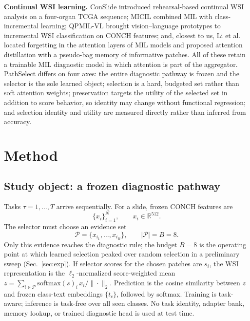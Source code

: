 \documentclass{article}
\newcommand{\Psel}{\mathcal{P}}
\begin{document}
\textbf{Continual WSI learning.} ConSlide \cite{huang2023conslide} introduced rehearsal-based continual WSI analysis on a four-organ TCGA sequence; MICIL \cite{meseguer2024micil} combined MIL with class-incremental learning; QPMIL-VL \cite{gou2025qpmil} brought vision--language prototypes to incremental WSI classification on CONCH features; and, closest to us, Li et al.\ \cite{li2025akd} located forgetting in the attention layers of MIL models and proposed attention distillation with a pseudo-bag memory of informative patches. All of these retain a trainable MIL diagnostic model in which attention is part of the aggregator. PathSelect differs on four axes: the entire diagnostic pathway is frozen and the selector is the sole learned object; selection is a hard, budgeted set rather than soft attention weights; preservation targets the utility of the selected set in addition to score behavior, so identity may change without functional regression; and selection identity and utility are measured directly rather than inferred from accuracy.

\section{Method}
\label{sec:method}

\subsection{Study object: a frozen diagnostic pathway}
\label{ssec:setup}

Tasks $\tau=1,\ldots,T$ arrive sequentially.
For a slide, frozen CONCH features are
\[
\{x_i\}_{i=1}^{N}, \qquad x_i\in\mathbb{R}^{512}.
\]
The selector must choose an evidence set
\[
\Psel=\{x_{i_1},\ldots,x_{i_B}\}, \qquad |\Psel|=B=8.
\]
Only this evidence reaches the diagnostic rule; the budget $B{=}8$ is the operating point at which learned selection peaked over random selection in a preliminary sweep (Sec.~\ref{sec:exp}).
If selector scores for the chosen patches are $s_i$, the WSI representation is the $\ell_2$-normalized score-weighted mean $z=\sum_{i\in\Psel}\mathrm{softmax}(s)_i\,x_i/\|\cdot\|_2$.
Prediction is the cosine similarity between $z$ and frozen class-text embeddings $\{t_c\}$, followed by softmax.
Training is task-aware; inference is task-free over all seen classes.
No task identity, adapter bank, memory lookup, or trained diagnostic head is used at test time.
\end{document}
